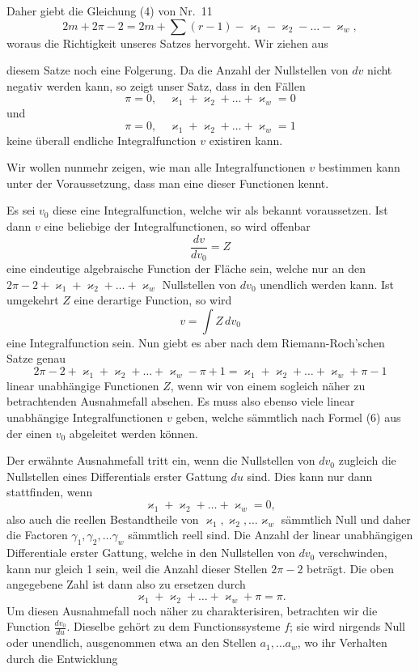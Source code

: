 \documentclass{article}
\begin{document}
Daher giebt die Gleichung (4) von Nr.~11
\[
2m + 2\pi - 2 = 2m + \sum(r-1) - \varkappa_1 - \varkappa_2 - \dots - \varkappa_w,
\]
woraus die Richtigkeit unseres Satzes hervorgeht. Wir ziehen aus

diesem Satze noch eine Folgerung. Da die Anzahl der Nullstellen von $dv$ nicht negativ werden kann, so zeigt unser Satz, dass in den Fällen
\[
\pi = 0, \quad \varkappa_1 + \varkappa_2 + \dots + \varkappa_w = 0
\]
und
\[
\pi = 0, \quad \varkappa_1 + \varkappa_2 + \dots + \varkappa_w = 1
\]
keine überall endliche Integralfunction $v$ existiren kann.

Wir wollen nunmehr zeigen, wie man alle Integralfunctionen $v$ bestimmen kann unter der Voraussetzung, dass man eine dieser Functionen kennt.

Es sei $v_0$ diese eine Integralfunction, welche wir als bekannt voraussetzen. Ist dann $v$ eine beliebige der Integralfunctionen, so wird offenbar
\[
\frac{dv}{dv_0} = Z \tag{5}
\]
eine eindeutige algebraische Function der Fläche sein, welche nur an den $2\pi - 2 + \varkappa_1 + \varkappa_2 + \dots + \varkappa_w$ Nullstellen von $dv_0$ unendlich werden kann. Ist umgekehrt $Z$ eine derartige Function, so wird
\[
v = \int Z\,dv_0 \tag{6}
\]
eine Integralfunction sein. Nun giebt es aber nach dem Riemann-Roch'schen Satze genau
\[
2\pi - 2 + \varkappa_1 + \varkappa_2 + \dots + \varkappa_w - \pi + 1 = \varkappa_1 + \varkappa_2 + \dots + \varkappa_w + \pi - 1
\]
linear unabhängige Functionen $Z$, wenn wir von einem sogleich näher zu betrachtenden Ausnahmefall absehen. Es muss also ebenso viele linear unabhängige Integralfunctionen $v$ geben, welche sämmtlich nach Formel (6) aus der einen $v_0$ abgeleitet werden können.

Der erwähnte Ausnahmefall tritt ein, wenn die Nullstellen von $dv_0$ zugleich die Nullstellen eines Differentials erster Gattung $du$ sind. Dies kann nur dann stattfinden, wenn
\[
\varkappa_1 + \varkappa_2 + \dots + \varkappa_w = 0,
\]
also auch die reellen Bestandtheile von $\varkappa_1, \varkappa_2, \dots \varkappa_w$ sämmtlich Null und daher die Factoren $\gamma_1, \gamma_2, \dots \gamma_w$ sämmtlich reell sind. Die Anzahl der linear unabhängigen Differentiale erster Gattung, welche in den Nullstellen von $dv_0$ verschwinden, kann nur gleich 1 sein, weil die Anzahl dieser Stellen $2\pi - 2$ beträgt. Die oben angegebene Zahl ist dann also zu ersetzen durch
\[
\varkappa_1 + \varkappa_2 + \dots + \varkappa_w + \pi = \pi.
\]
Um diesen Ausnahmefall noch näher zu charakterisiren, betrachten wir die Function $\frac{dv_0}{du}$. Dieselbe gehört zu dem Functionssysteme $f$; sie wird nirgends Null oder unendlich, ausgenommen etwa an den Stellen $a_1, \dots a_w$, wo ihr Verhalten durch die Entwicklung
\end{document}
